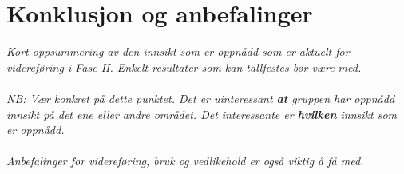 \section{Konklusjon og anbefalinger}
\label{sec:konklusjon}
\textit{Kort oppsummering av den innsikt som er oppnådd som er aktuelt for videreføring i Fase II. Enkelt-resultater som kan tallfestes bør være med.\\
\\
NB: Vær konkret på dette punktet. Det er uinteressant \textbf{at} gruppen har oppnådd innsikt på det ene eller andre området. Det interessante er \textbf{hvilken} innsikt som er oppnådd. \\
\\
Anbefalinger for videreføring, bruk og vedlikehold er også viktig å få med.}
